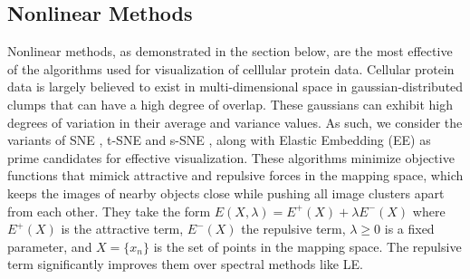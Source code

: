 \documentclass{article}
\begin{document}
\subsection{Nonlinear Methods}
Nonlinear methods, as demonstrated in the section below, are the most effective of the algorithms used for visualization of celllular protein data. Cellular protein data is largely believed to exist in multi-dimensional space in gaussian-distributed clumps that can have a high degree of overlap. These gaussians can exhibit high degrees of variation in their average and variance values. As such, we consider the variants of SNE \cite{Hinton:2002vs}, t-SNE \cite{VanderMaaten:2008tm} and s-SNE \cite{Cook:2007tb}, along with Elastic Embedding (EE) \cite{CarreiraPerpinan:2010tx} as prime candidates for effective visualization. These algorithms minimize objective functions that mimick attractive and repulsive forces in the mapping space, which keeps the images of nearby objects close while pushing all image clusters apart from each other. They take the form $E(X, \lambda) = E^+(X) + \lambda E^-(X)$ where $E^+(X)$ is the attractive term, $E^-(X)$ the repulsive term, $\lambda \geq 0$ is a fixed parameter, and $X = \{x_n\}$ is the set of points in the mapping space. The repulsive term significantly improves them over spectral methods like LE. 
\end{document}
